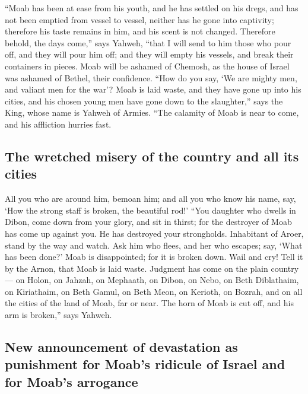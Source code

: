  ``Moab has been at ease from his youth, and he has
settled on his dregs, and has not been emptied from vessel to vessel,
neither has he gone into captivity; therefore his taste remains in him,
and his scent is not changed.  Therefore behold, the days
come,'' says Yahweh, ``that I will send to him those who pour off, and
they will pour him off; and they will empty his vessels, and break their
containers in pieces.  Moab will be ashamed of Chemosh,
as the house of Israel was ashamed of Bethel, their confidence.
 ``How do you say, `We are mighty men, and valiant men
for the war'?  Moab is laid waste, and they have gone up
into his cities, and his chosen young men have gone down to the
slaughter,'' says the King, whose name is Yahweh of Armies.
 ``The calamity of Moab is near to come, and his
affliction hurries fast.

\hypertarget{the-wretched-misery-of-the-country-and-all-its-cities}{%
\subsection{The wretched misery of the country and all its
cities}\label{the-wretched-misery-of-the-country-and-all-its-cities}}

 All you who are around him, bemoan him; and all you who
know his name, say, `How the strong staff is broken, the beautiful rod!'
 ``You daughter who dwells in Dibon, come down from your
glory, and sit in thirst; for the destroyer of Moab has come up against
you. He has destroyed your strongholds.  Inhabitant of
Aroer, stand by the way and watch. Ask him who flees, and her who
escapes; say, `What has been done?'  Moab is
disappointed; for it is broken down. Wail and cry! Tell it by the Arnon,
that Moab is laid waste.  Judgment has come on the plain
country--- on Holon, on Jahzah, on Mephaath,  on Dibon,
on Nebo, on Beth Diblathaim,  on Kiriathaim, on Beth
Gamul, on Beth Meon,  on Kerioth, on Bozrah, and on all
the cities of the land of Moab, far or near.  The horn of
Moab is cut off, and his arm is broken,'' says Yahweh.

\hypertarget{new-announcement-of-devastation-as-punishment-for-moabs-ridicule-of-israel-and-for-moabs-arrogance}{%
\subsection{New announcement of devastation as punishment for Moab's
ridicule of Israel and for Moab's
arrogance}\label{new-announcement-of-devastation-as-punishment-for-moabs-ridicule-of-israel-and-for-moabs-arrogance}}

